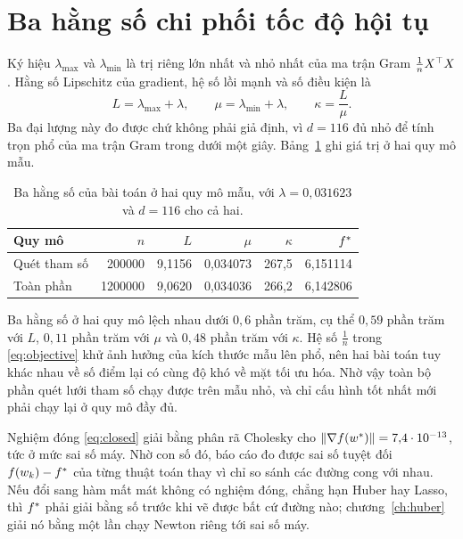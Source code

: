 \documentclass[12pt, a4paper, oneside]{report}
\theoremstyle{definition}
\begin{document}
\section{Ba hằng số chi phối tốc độ hội tụ}

Ký hiệu $\lambda_{\max}$ và $\lambda_{\min}$ là trị riêng lớn nhất và nhỏ nhất
của ma trận Gram $\frac{1}{n} X^{\top} X$. Hằng số Lipschitz của gradient, hệ số
lồi mạnh và số điều kiện là
\begin{equation}\label{eq:constants}
  L = \lambda_{\max} + \lambda, \qquad \mu = \lambda_{\min} + \lambda, \qquad \kappa = \frac{L}{\mu}.
\end{equation}
Ba đại lượng này đo được chứ không phải giả định, vì $d = 116$ đủ nhỏ để tính
trọn phổ của ma trận Gram trong dưới một giây. Bảng~\ref{tab:hangso} ghi giá trị
ở hai quy mô mẫu.

\begin{table}[tbp]
  \centering
  \caption{Ba hằng số của bài toán ở hai quy mô mẫu, với $\lambda = 0{,}031623$
    và $d = 116$ cho cả hai.}
  \label{tab:hangso}
  \begin{tabular}{lrrrrr}
    \toprule
    Quy mô & $n$ & $L$ & $\mu$ & $\kappa$ & $f^{*}$ \\
    \midrule
    Quét tham số & \num{200000}  & 9{,}1156 & 0{,}034073 & 267{,}5 & 6{,}151114 \\
    Toàn phần    & \num{1200000} & 9{,}0620 & 0{,}034036 & 266{,}2 & 6{,}142806 \\
    \bottomrule
  \end{tabular}
\end{table}

Ba hằng số ở hai quy mô lệch nhau dưới $0{,}6$ phần trăm, cụ thể $0{,}59$ phần
trăm với $L$, $0{,}11$ phần trăm với $\mu$ và $0{,}48$ phần trăm với $\kappa$.
Hệ số $\frac{1}{n}$ trong \eqref{eq:objective} khử ảnh hưởng của kích thước mẫu
lên phổ, nên hai bài toán tuy khác nhau về số điểm lại có cùng độ khó về mặt tối
ưu hóa. Nhờ vậy toàn bộ phần quét lưới tham số chạy được
trên mẫu nhỏ, và chỉ cấu hình tốt nhất mới phải chạy lại ở quy mô đầy đủ.

Nghiệm đóng \eqref{eq:closed} giải bằng phân rã Cholesky cho
$\lVert\nabla f(w^{*})\rVert = 7{,}4 \cdot 10^{-13}$, tức ở mức sai số máy. Nhờ con số
đó, báo cáo đo được sai số tuyệt đối $f(w_k) - f^{*}$ của từng thuật toán thay vì
chỉ so sánh các đường cong với nhau. Nếu đổi sang hàm mất mát không có nghiệm
đóng, chẳng hạn Huber hay Lasso, thì $f^{*}$ phải giải bằng số trước khi vẽ được
bất cứ đường nào; chương~\ref{ch:huber} giải nó bằng một lần chạy Newton riêng tới
sai số máy.
\end{document}
